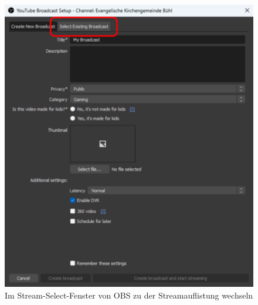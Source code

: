 \begin{figure}[H]
	\centering
	\includegraphics[width=\textwidth]{figures/obs-stream-select}
	
	\caption{Im Stream-Select-Fenster von OBS zu der Streamauflistung wechseln}
	\label{fig:obs:stream-select}
\end{figure}


